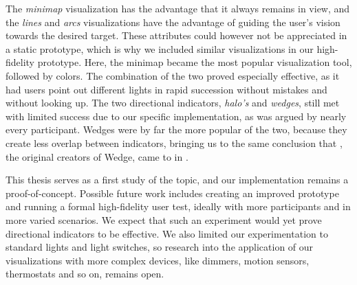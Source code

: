 The \textit{minimap} visualization has the advantage that it always remains in view, and the \textit{lines} and \textit{arcs} visualizations have the advantage of guiding the user's vision towards the desired target. These attributes could however not be appreciated in a static prototype, which is why we included similar visualizations in our high-fidelity prototype. Here, the minimap became the most popular visualization tool, followed by colors. The combination of the two proved especially effective, as it had users point out different lights in rapid succession without mistakes and without looking up. The two directional indicators, \textit{halo's} and \textit{wedges}, still met with limited success due to our specific implementation, as was argued by nearly every participant. Wedges were by far the more popular of the two, because they create less overlap between indicators, bringing us to the same conclusion that \citeauthor{gustafson2008wedge}, the original creators of Wedge, came to in \citeyear{gustafson2008wedge} \cite{gustafson2008wedge}.

This thesis serves as a first study of the topic, and our implementation remains a proof-of-concept. Possible future work includes creating an improved prototype and running a formal high-fidelity user test, ideally with more participants and in more varied scenarios. We expect that such an experiment would yet prove directional indicators to be effective. We also limited our experimentation to standard lights and light switches, so research into the application of our visualizations with more complex devices, like dimmers, motion sensors, thermostats and so on, remains open.


